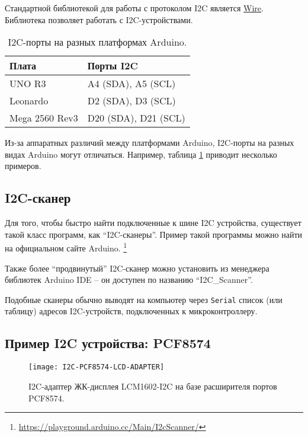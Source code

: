 \documentclass[../sparc.tex]{subfiles}
\begin{document}
Стандартной библиотекой для работы с протоколом I2C является
\href{https://www.arduino.cc/reference/en/language/functions/communication/wire/}{Wire}.
Библиотека позволяет работать с I2C-устройствами.

\begin{table}[h]
  \centering
  \begin{tabular}{ | m{5em} | m{2cm} | }
    \hline
    Плата & Порты I2C \\
    \hline
    UNO R3 & A4 (SDA), A5 (SCL) \\
    \hline
    Leonardo & D2 (SDA), D3 (SCL) \\
    \hline
    Mega 2560 Rev3 & D20 (SDA), D21 (SCL) \\
    \hline
  \end{tabular}
  \caption{I2C-порты на разных платформах Arduino.}
  \label{table:i2c-pins}
\end{table}

Из-за аппаратных различий между платформами Arduino, I2C-порты на разных видах
Arduino могут отличаться. Например, таблица \ref{table:i2c-pins} приводит
несколько примеров.

\subsection{I2C-сканер}
\label{section:i2c-scanner}

Для того, чтобы быстро найти подключенные к шине \gls{I2C} устройства,
существует такой класс программ, как ``I2C-сканеры''.  Пример такой программы
можно найти на официальном сайте
Arduino. \footnote{\url{https://playground.arduino.cc/Main/I2cScanner/}}

Также более ``продвинутый'' I2C-сканер можно установить из менеджера библиотек
Arduino IDE -- он доступен по названию ``I2C\_Scanner''.

Подобные сканеры обычно выводят на компьютер через \texttt{Serial} список (или
таблицу) адресов I2C-устройств, подключенных к микроконтроллеру.

\subsection{Пример I2C устройства: PCF8574}

\begin{figure}[H]
  \centering
  \texttt{[image: I2C-PCF8574-LCD-ADAPTER]}
  \caption{I2C-адаптер ЖК-дисплея LCM1602-I2C на базе расширителя портов
    PCF8574.}
  \label{fig:i2c-pcf8574-lcd-adapter}
\end{figure}
\end{document}
